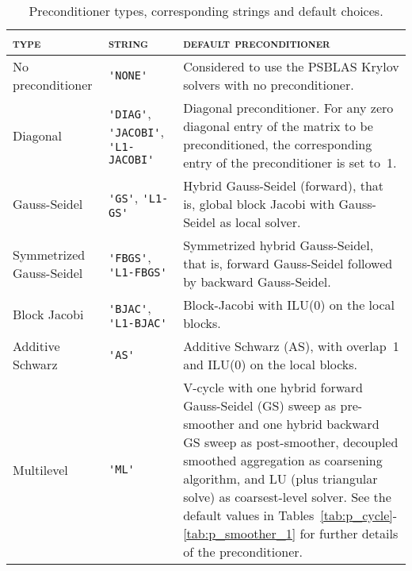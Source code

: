 \begin{table}[h!]
\begin{center}
\begin{tabular}{|l|p{2cm}|p{8cm}|}
\hline
\textsc{type}       & \textsc{string} & \textsc{default preconditioner} \\ \hline
No preconditioner &\verb|'NONE'|& Considered  to use the PSBLAS
                                    Krylov solvers with no preconditioner. \\ \hline
Diagonal          & \verb|'DIAG'|, \verb|'JACOBI'|, \verb|'L1-JACOBI'| & Diagonal preconditioner.
                         For any zero diagonal entry of the matrix to be preconditioned,
                         the corresponding entry of the preconditioner is set to~1.\\ \hline
Gauss-Seidel      & \verb|'GS'|, \verb|'L1-GS'|     & Hybrid Gauss-Seidel (forward), that is,
                                      global block Jacobi with
                                      Gauss-Seidel as local solver.\\ \hline
Symmetrized Gauss-Seidel      & \verb|'FBGS'|, \verb|'L1-FBGS'|     & Symmetrized hybrid Gauss-Seidel, that is,
                                      forward Gauss-Seidel followed by
                                                    backward Gauss-Seidel.\\ \hline
Block Jacobi      & \verb|'BJAC'|, \verb|'L1-BJAC'| & Block-Jacobi with ILU(0) on the local blocks.\\ \hline
Additive Schwarz  & \verb|'AS'|   & Additive Schwarz (AS),
                                    with overlap~1 and ILU(0) on the local blocks. \\ \hline
Multilevel        &\verb|'ML'|    & V-cycle with one hybrid forward Gauss-Seidel
                                    (GS) sweep as pre-smoother and one hybrid backward
                                    GS sweep as post-smoother, decoupled smoothed aggregation
                                   as coarsening algorithm, and LU (plus triangular solve)
                                   as coarsest-level solver. See the default values in
                                   Tables~\ref{tab:p_cycle}-\ref{tab:p_smoother_1}
                                   for further details of the preconditioner. \\
\hline
\end{tabular}
\caption{Preconditioner types, corresponding strings and default choices.
\label{tab:precinit}}
\end{center}
\end{table}

